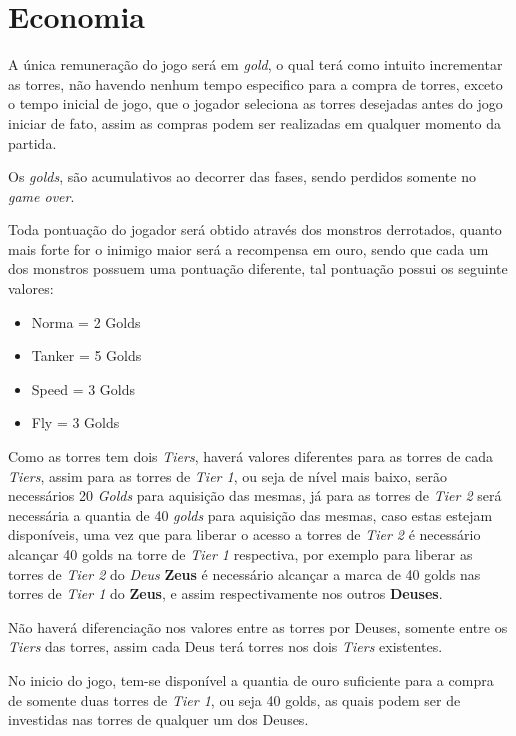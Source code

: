 \documentclass[11pt]{article} %
\begin{document}
\newpage

\section{Economia}

A única remuneração do jogo será em \textit{gold}, o qual terá como intuito incrementar as torres, não havendo nenhum tempo especifico para a compra de torres, exceto o tempo inicial de jogo, que o jogador seleciona as torres desejadas antes do jogo iniciar de fato, assim as compras podem ser realizadas em qualquer momento da partida.

Os \textit{golds}, são acumulativos ao decorrer das fases, sendo perdidos somente no \textit{game over}.

Toda pontuação do jogador será obtido através dos monstros derrotados, quanto mais forte for o inimigo  maior será a recompensa em ouro, sendo que cada um dos monstros possuem uma pontuação diferente, tal pontuação possui os seguinte valores:

\begin{itemize}
 \item Norma = 2 Golds
 \item Tanker = 5 Golds
 \item Speed = 3 Golds
 \item Fly = 3 Golds
 \end{itemize} 
 
Como as torres tem dois \textit{Tiers}, haverá valores diferentes para as torres de cada \textit{Tiers}, assim para as torres de \textit{Tier 1}, ou seja de nível mais baixo, serão necessários 20 \textit{Golds} para aquisição das mesmas, já para as torres de \textit{Tier 2} será necessária a quantia de 40 \textit{golds} para aquisição das mesmas, caso estas estejam disponíveis, uma vez que para liberar o acesso a torres de \textit{Tier 2} é necessário alcançar 40 golds na torre de \textit{Tier 1} respectiva, por exemplo para liberar as torres de \textit{Tier 2} do \textit{Deus} \textbf{Zeus} é necessário alcançar a marca de 40 golds nas torres de \textit{Tier 1} do \textbf{Zeus}, e assim respectivamente nos outros \textbf{Deuses}.

Não haverá diferenciação nos valores entre as torres por Deuses, somente entre os \textit{Tiers} das torres, assim cada Deus terá torres nos dois \textit{Tiers} existentes.
 
No inicio do jogo, tem-se disponível a quantia de ouro suficiente para a compra de somente duas torres de \textit{Tier 1}, ou seja 40 golds, as quais podem ser de investidas nas torres de qualquer um dos Deuses.  
\end{document}
